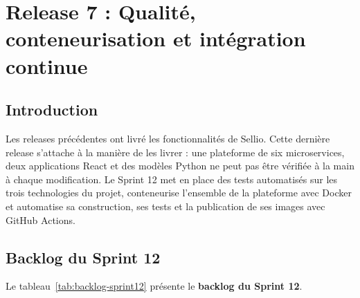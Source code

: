 \thispagestyle{fancy}
\chapter{Release 7 : Qualité, conteneurisation et intégration continue}
\section*{Introduction}
Les releases précédentes ont livré les fonctionnalités de Sellio. Cette dernière release s'attache à la manière de les livrer : une plateforme de six microservices, deux applications React et des modèles Python ne peut pas être vérifiée à la main à chaque modification. Le Sprint 12 met en place des tests automatisés sur les trois technologies du projet, conteneurise l'ensemble de la plateforme avec Docker et automatise sa construction, ses tests et la publication de ses images avec GitHub Actions.

\section{Backlog du Sprint 12}
Le tableau~\ref{tab:backlog-sprint12} présente le \textbf{backlog du Sprint 12}.

